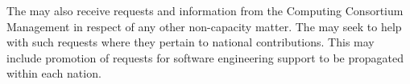 \documentclass[../main-v1.tex]{subfiles}
\begin{document}
The  may also receive requests and information from the Computing Consortium Management in respect of any other non-capacity matter. The  may seek to help with such requests where they pertain to national contributions. This may include promotion of requests for software engineering support to be propagated within each nation.
\end{document}
